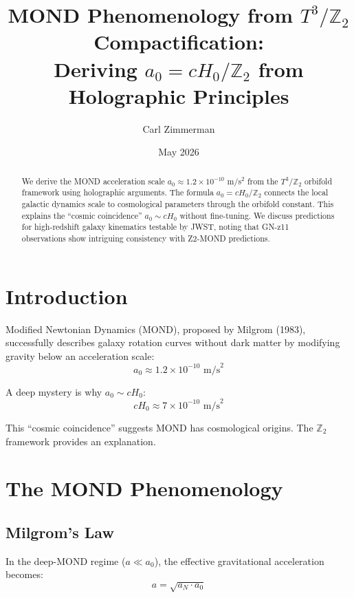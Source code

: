 \documentclass[12pt,a4paper]{article}
\title{MOND Phenomenology from $T^3/\mathbb{Z}_2$ Compactification:\\
Deriving $a_0 = cH_0/\mathbb{Z}_2$ from Holographic Principles}
\author{Carl Zimmerman}
\date{May 2026}
\begin{document}
\maketitle

\begin{abstract}
We derive the MOND acceleration scale $a_0 \approx 1.2 \times 10^{-10}$ m/s$^2$ from the $T^3/\mathbb{Z}_2$ orbifold framework using holographic arguments. The formula $a_0 = cH_0/\mathbb{Z}_2$ connects the local galactic dynamics scale to cosmological parameters through the orbifold constant. This explains the ``cosmic coincidence'' $a_0 \sim cH_0$ without fine-tuning. We discuss predictions for high-redshift galaxy kinematics testable by JWST, noting that GN-z11 observations show intriguing consistency with Z2-MOND predictions.
\end{abstract}

\section{Introduction}

Modified Newtonian Dynamics (MOND), proposed by Milgrom (1983), successfully describes galaxy rotation curves without dark matter by modifying gravity below an acceleration scale:
\begin{equation}
a_0 \approx 1.2 \times 10^{-10} \text{ m/s}^2
\end{equation}

A deep mystery is why $a_0 \sim cH_0$:
\begin{equation}
cH_0 \approx 7 \times 10^{-10} \text{ m/s}^2
\end{equation}

This ``cosmic coincidence'' suggests MOND has cosmological origins. The $\mathbb{Z}_2$ framework provides an explanation.

\section{The MOND Phenomenology}

\subsection{Milgrom's Law}

In the deep-MOND regime ($a \ll a_0$), the effective gravitational acceleration becomes:
\begin{equation}
a = \sqrt{a_N \cdot a_0}
\end{equation}
\end{document}
